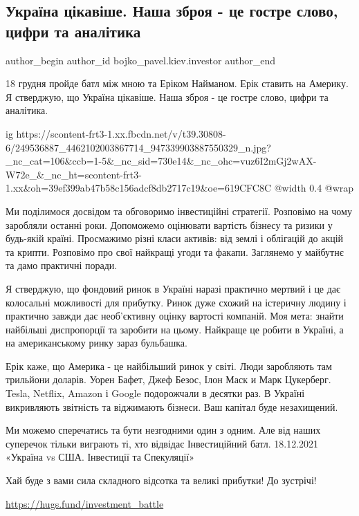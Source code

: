  
 
 
 
 
 
\subsection{Україна цікавіше. Наша зброя - це гостре слово, цифри та аналітика}
\label{sec:26_10_2021.fb.bojko_pavel.kiev.investor.1.ukraina_battl}
 
\ifcmt
 author_begin
   author_id bojko_pavel.kiev.investor
 author_end
\fi

18 грудня пройде батл між мною та Еріком Найманом. Ерік ставить на Америку. Я
стверджую, що Україна цікавіше. Наша зброя - це гостре слово, цифри та
аналітика.

\ifcmt
  ig https://scontent-frt3-1.xx.fbcdn.net/v/t39.30808-6/249536887_4462102003867714_947339903887550329_n.jpg?_nc_cat=106&ccb=1-5&_nc_sid=730e14&_nc_ohc=vuz6I2mGj2wAX-W72e_&_nc_ht=scontent-frt3-1.xx&oh=39ef399ab47b58c156adcf8db2717c19&oe=619CFC8C
  @width 0.4
  @wrap 
\fi

Ми поділимося досвідом та обговоримо інвестиційні стратегії. Розповімо на чому
заробляли останні роки. Допоможемо оцінювати вартість бізнесу та ризики у
будь-якій країні. Просмажимо різні класи активів: від землі і облігацій до
акцій та крипти. Розповімо про свої найкращі угоди та факапи. Заглянемо у
майбутнє та дамо практичні поради.

Я стверджую, що фондовий ринок в Україні наразі практично мертвий і це дає
колосальні можливості для прибутку. Ринок дуже схожий на істеричну людину і
практично завжди дає необ’єктивну оцінку вартості компаній. Моя мета:  знайти
найбільші диспропорції та заробити на цьому. Найкраще це робити в Україні, а на
американському ринку зараз бульбашка.

Ерік каже, що Америка - це найбільший ринок у світі. Люди заробляють там
трильйони доларів. Уорен Бафет, Джеф Безос, Ілон Маск и Марк Цукерберг. Tesla,
Netflix, Amazon і Google подорожчали в десятки раз. В Україні викривляють
звітність та віджимають бізнеси. Ваш капітал буде незахищений.

Ми можемо сперечатись та бути незгодними один з одним. Але від наших суперечок
тільки виграють ті, хто відвідає Інвестиційний батл. 18.12.2021  «Україна vs
США. Інвестиції та Спекуляції»

Хай буде з вами сила складного відсотка та великі прибутки! До зустрічі! 

\url{https://hugs.fund/investment_battle}

